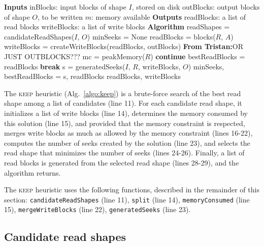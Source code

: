 \documentclass[sigconf, nonacm]{acmart}
\newcommand{\tristan}[1]{\color{orange}\textbf{From Tristan:}#1\color{black}}
\newcommand{\keep}[0]{\textsc{keep}\xspace}
\begin{document}
\begin{algorithm}
  \caption{\keep heuristic (implements \texttt{getReadWriteBlocks})}
  \label{algo:keep}
  \begin{algorithmic}[1]
    \STATE \textbf{Inputs}
    \STATE inBlocks: input blocks of shape $I$, stored on disk
    \STATE outBlocks: output blocks of shape $O$, to be written
    \STATE $m$: memory available
    \STATE
    \STATE \textbf{Outputs}
    \STATE readBlocks: a list of read blocks
    \STATE writeBlocks: a list of write blocks
    \STATE
    \STATE \textbf{Algorithm}
    \STATE readShapes = candidateReadShapes($I$, $O$)
    \STATE minSeeks = None
      \STATE readBlocks = blocks($R$, $A$)
      \STATE writeBlocks = createWriteBlocks(readBlocks, outBlocks)  \tristan{OR JUST OUTBLOCKS???}
      \STATE mc = peakMemory($R$)
      \STATE \textbf{continue} 
      \ENDIF
      \STATE bestReadBlocks = readBlocks
      \STATE \textbf{break} 
      \ENDIF
      \STATE s = generatedSeeks($I$, $R$, writeBlocks, $O$)
      \STATE minSeeks, bestReadBlocks = s, readBlocks
      \ENDIF
    \ENDFOR
    \RETURN readBlocks, writeBlocks
  \end{algorithmic}
\end{algorithm}
The \keep heuristic (Alg.~\ref{algo:keep}) is a brute-force search
of the best read shape among a list of candidates (line 11).
For each candidate read shape, it initializes a list of write blocks (line
14), determines the memory consumed by this solution (line 15), and provided that the
memory constraint is respected, merges write blocks as much as allowed by the memory
constraint (lines 16-22), computes
the number of seeks created by the solution (line
23), and selects the read shape that minimizes the number of seeks (lines
24-26). Finally, a list of read blocks is generated from the selected read shape (lines
28-29), and the algorithm returns.

The \keep heuristic uses the following functions, described in the
remainder of this section: \texttt{candidateReadShapes} (line 11),
\texttt{split} (line 14), \texttt{memoryConsumed} (line 15),
\texttt{mergeWriteBlocks} (line 22), \texttt{generatedSeeks} (line 23).

\subsection{Candidate read shapes}
\end{document}
